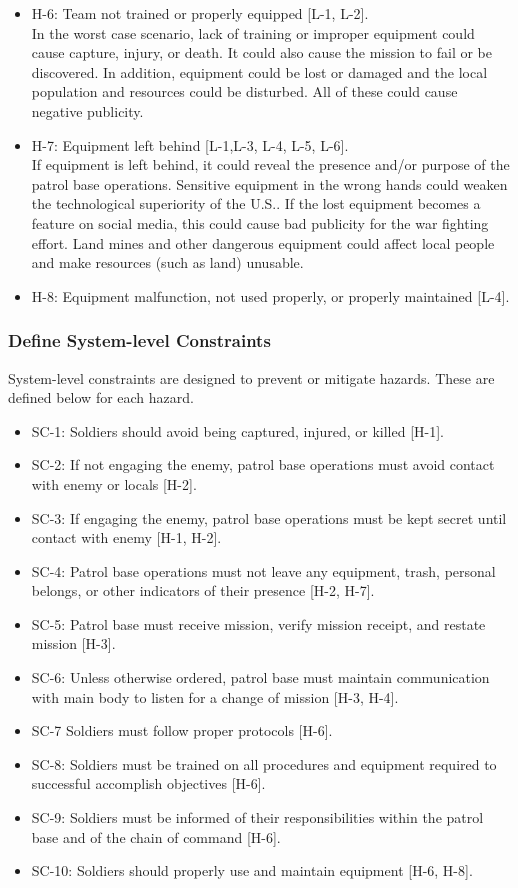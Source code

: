 \documentclass[../../main/main.tex]{subfiles}
\begin{document}
\begin{itemize}
\item H-6: Team not trained or properly equipped [L-1, L-2].\\
In the worst case scenario, lack of training or improper equipment could cause capture, injury, or death.  It could also cause the mission to fail or be discovered.  In addition, equipment could be lost or damaged and the local population and resources could be disturbed.  All of these could cause negative publicity.

\item H-7: Equipment left behind [L-1,L-3, L-4, L-5, L-6].\\
If equipment is left behind, it could reveal the presence and/or purpose of the patrol base operations.  Sensitive equipment in the wrong hands could weaken the technological superiority of the U.S.. If the lost equipment becomes a feature on social media, this could cause bad publicity for the war fighting effort.  Land mines and other dangerous equipment could affect local people and make resources (such as land) unusable.

\item H-8: Equipment malfunction, not used properly, or properly maintained [L-4].\\
\end{itemize}

\subsubsection{Define System-level Constraints}
System-level constraints are designed to prevent or mitigate hazards.  These are defined below for each hazard.

\begin{itemize}
\item SC-1: Soldiers should avoid being captured, injured, or killed [H-1].
\item SC-2: If not engaging the enemy, patrol base operations must avoid contact with enemy or locals [H-2].
\item SC-3: If engaging the enemy, patrol base operations must be kept secret until contact with enemy [H-1, H-2].
\item SC-4: Patrol base operations must not leave any equipment, trash, personal belongs, or other indicators of their presence [H-2, H-7].
\item SC-5: Patrol base must receive mission, verify mission receipt, and restate mission [H-3].
\item SC-6: Unless otherwise ordered, patrol base must maintain communication with main body to listen for a change of mission [H-3, H-4].
\item SC-7 Soldiers must follow proper protocols [H-6].
\item SC-8: Soldiers must be trained on all procedures and equipment required to successful accomplish objectives [H-6].
\item SC-9: Soldiers must be informed of their responsibilities within the patrol base and of the chain of command [H-6].
\item SC-10: Soldiers should properly use and maintain equipment [H-6, H-8].
\end{itemize}
\end{document}
